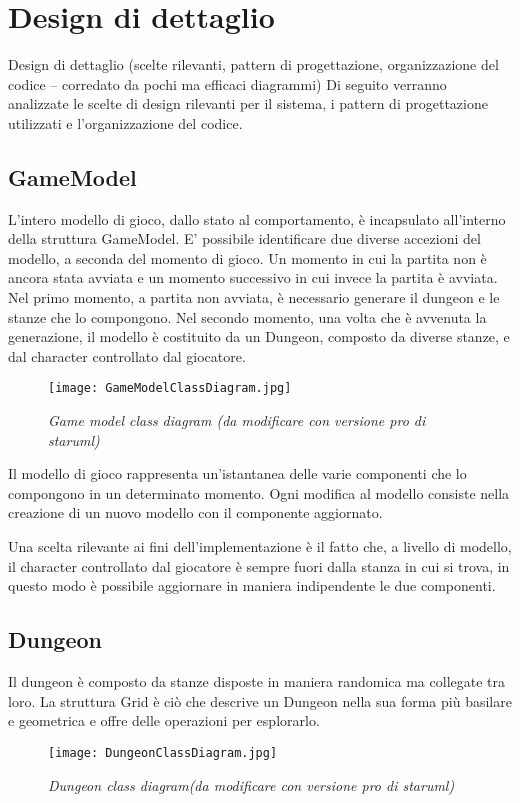 \section{Design di dettaglio}
Design di dettaglio (scelte rilevanti, pattern di progettazione, organizzazione del codice -- corredato da pochi ma efficaci diagrammi)
Di seguito verranno analizzate le scelte di design rilevanti per il sistema, i pattern di progettazione utilizzati e l'organizzazione del codice. 
\subsection{GameModel}
L'intero modello di gioco, dallo stato al comportamento, è incapsulato all'interno della struttura GameModel. E' possibile identificare due diverse accezioni del modello, a seconda del momento di gioco. 
Un momento in cui la partita non è ancora stata avviata e un momento successivo in cui invece la partita è avviata.
Nel primo momento, a partita non avviata, è necessario generare il dungeon e le stanze che lo compongono. Nel secondo momento, una volta che è avvenuta la generazione, il modello è costituito da un Dungeon, composto da diverse stanze, e dal character controllato dal giocatore. 

\begin{figure}[!hbt]
    \centering
    \texttt{[image: GameModelClassDiagram.jpg]}
    \caption{\textit{Game model class diagram (da modificare con versione pro di staruml)}} 
\end{figure}
Il modello di gioco rappresenta un'istantanea delle varie componenti che lo compongono in un determinato momento. 
Ogni modifica al modello consiste nella creazione di un nuovo modello con il componente aggiornato. 

Una scelta rilevante ai fini dell'implementazione è il fatto che, a livello di modello, il character controllato dal giocatore è sempre fuori dalla stanza in cui si trova, in questo modo è possibile aggiornare in maniera indipendente le due componenti.
\subsection{Dungeon}
Il dungeon è composto da stanze disposte in maniera randomica ma collegate tra loro. 
La struttura Grid è ciò che descrive un Dungeon nella sua forma più basilare e geometrica e offre delle operazioni per esplorarlo. 
\begin{figure}[!hbt]
    \centering
    \texttt{[image: DungeonClassDiagram.jpg]}
    \caption{\textit{Dungeon class diagram(da modificare con versione pro di staruml)}} 
\end{figure}

